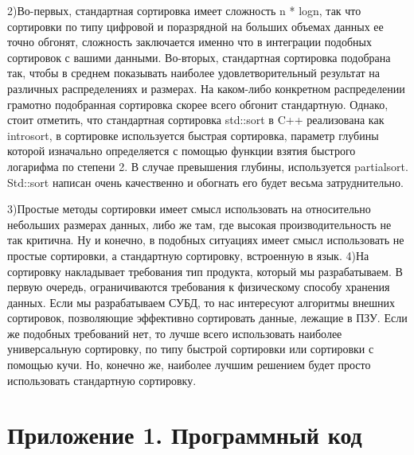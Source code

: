 \documentclass[a4paper, 14pt]{report}
\begin{document}
2)Во-первых, стандартная сортировка имеет сложность n * logn, так что сортировки по типу цифровой и поразрядной на больших объемах данных ее точно обгонят, сложность заключается именно что в интеграции подобных сортировок с вашими данными. Во-вторых, стандартная сортировка подобрана так, чтобы в среднем показывать наиболее удовлетворительный результат на различных распределениях и размерах. На каком-либо конкретном распределении грамотно подобранная сортировка скорее всего обгонит стандартную. Однако, стоит отметить, что стандартная сортировка std::sort в C++ реализована как introsort, в сортировке используется быстрая сортировка, параметр глубины которой изначально определяется с помощью функции взятия быстрого логарифма по степени 2. В случае превышения глубины, используется partialsort. Std::sort написан очень качественно и обогнать его будет весьма затруднительно.

3)Простые методы сортировки имеет смысл использовать на относительно небольших размерах данных, либо же там, где высокая производительность не так критична. Ну и конечно, в подобных ситуациях имеет смысл использовать не простые сортировки, а стандартную сортировку, встроенную в язык.
4)На сортировку накладывает требования тип продукта, который мы разрабатываем. В первую очередь, ограничиваются требования к физическому способу хранения данных. Если мы разрабатываем СУБД, то нас интересуют алгоритмы внешних сортировок, позволяющие эффективно сортировать данные, лежащие в ПЗУ. Если же подобных требований нет, то лучше всего использовать наиболее универсальную сортировку, по типу быстрой сортировки или сортировки с помощью кучи. Но, конечно же, наиболее лучшим решением будет просто использовать стандартную сортировку.

\section{Приложение 1. Программный код}
\end{document}
